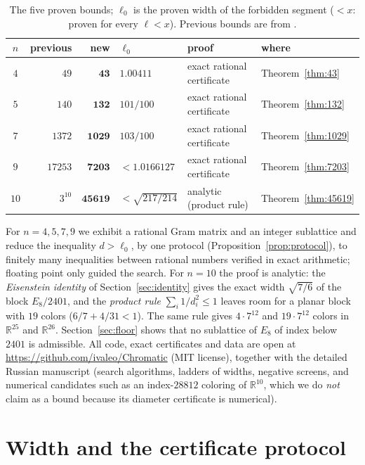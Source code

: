 \documentclass[10pt]{article}
\theoremstyle{plain}
\theoremstyle{remark}
\newcommand{\R}{\mathbb{R}}
\begin{document}
\begin{table}[htbp]\centering\small
\caption{The five proven bounds; $\ell_0$ is the proven width of the
forbidden segment ($<x$: proven for every $\ell<x$). Previous bounds are
from \cite{ABPR}.}
\label{tab:main}
\begin{tabular}{@{}c r r l l l@{}}
\toprule
$n$ & previous & new & $\ell_0$ & proof & where \\
\midrule
$4$  & $49$    & $\mathbf{43}$    & $1.00411$        & exact rational certificate & Theorem~\ref{thm:43}\\
$5$  & $140$   & $\mathbf{132}$   & $101/100$        & exact rational certificate & Theorem~\ref{thm:132}\\
$7$  & $1372$  & $\mathbf{1029}$  & $103/100$        & exact rational certificate & Theorem~\ref{thm:1029}\\
$9$  & $17253$ & $\mathbf{7203}$  & $<1.0166127$     & exact rational certificate & Theorem~\ref{thm:7203}\\
$10$ & $3^{10}$& $\mathbf{45619}$ & $<\sqrt{217/214}$& analytic (product rule) & Theorem~\ref{thm:45619}\\
\bottomrule
\end{tabular}
\end{table}

For $n=4,5,7,9$ we exhibit a rational Gram matrix and an integer sublattice
and reduce the inequality $d>\ell_0$, by one protocol
(Proposition~\ref{prop:protocol}), to finitely many inequalities between
rational numbers verified in exact arithmetic; floating point only guided
the search. For $n=10$ the proof is analytic: the \emph{Eisenstein identity}
of Section~\ref{sec:identity} gives the exact width $\sqrt{7/6}$ of the
block $E_8/2401$, and the \emph{product rule} $\sum_i1/d_i^2\le1$ leaves
room for a planar block with $19$ colors ($6/7+4/31<1$). The same rule gives
$4\cdot7^{12}$ and $19\cdot7^{12}$ colors in $\R^{25}$ and $\R^{26}$.
Section~\ref{sec:floor} shows that no sublattice of $E_8$ of index below
$2401$ is admissible. All code, exact certificates and data are open at
\url{https://github.com/ivaleo/Chromatic} (MIT license), together with the
detailed Russian manuscript (search algorithms, ladders of widths, negative
screens, and numerical candidates such as an index-$28812$ coloring of
$\R^{10}$, which we do \emph{not} claim as a bound because its diameter
certificate is numerical).

\section{Width and the certificate protocol}\label{sec:method}
\end{document}

